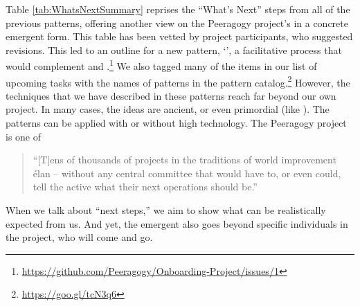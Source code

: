 



Table \ref{tab:WhatsNextSummary} reprises the ``What's Next'' steps
from all of the previous patterns, offering another view on the
Peeragogy project's  in a concrete emergent form.
%
This table has been vetted by project participants, who suggested
revisions.  This led to an outline for a new pattern,
`', a facilitative process that would
complement  and .\footnote{\url{https://github.com/Peeragogy/Onboarding-Project/issues/1}}
We also tagged many of the items in our list of upcoming tasks with the names of
patterns in the pattern catalog.\footnote{\url{https://goo.gl/tcN3q6}}
However, the techniques that we have described in these patterns reach
far beyond our own project.  In many cases, the ideas are ancient, or even
primordial (like ).  The patterns can be
applied with or without high technology.  The Peeragogy project is one
of
\begin{quote}
 ``[T]ens of thousands of projects in the traditions of world
improvement \'elan -- without any central committee that would have
to, or even could, tell the active what their next operations should
be.'' \cite[p. 402]{sloterdijk2013change}
\end{quote}
When we talk about ``next steps,'' we aim to show what can be
realistically expected from us.
And yet, the emergent  also goes beyond specific
individuals in the project, who will come and go.



